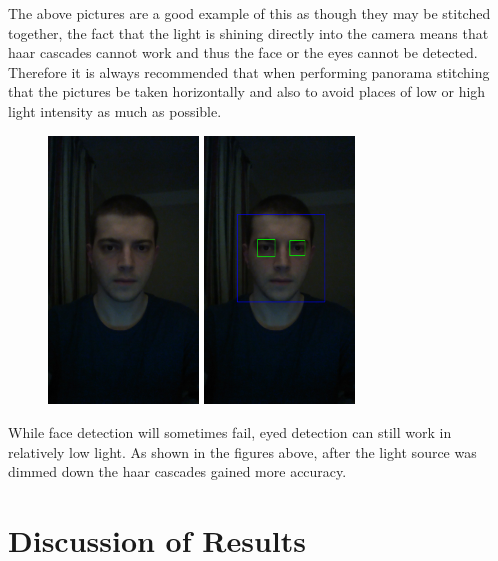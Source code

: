 \documentclass{article}
\begin{document}
The above pictures are a good example of this as though they may be stitched together, the fact that the light is shining directly into the camera means that haar cascades cannot work and thus the face or the eyes cannot be detected.\\
Therefore it is always recommended that when performing panorama stitching that the pictures be taken horizontally and also to avoid places of low or high light intensity as much as possible.

\begin{figure}[H]
	\centering
	\includegraphics[width=4cm]{img5.jpg}
	\includegraphics[width=4cm]{img55.png}
	
\end{figure}

While face detection will sometimes fail, eyed detection can still work in relatively low light. As shown in the figures above, after the light source was dimmed down the haar cascades gained more accuracy.\\


\section{Discussion of Results}\label{sec:overview}
\end{document}
